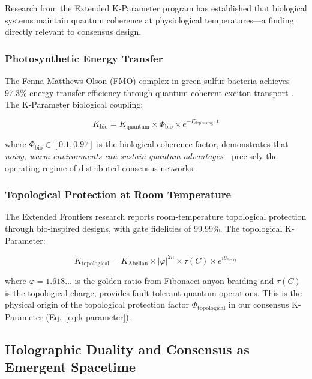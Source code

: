 \documentclass[11pt,a4paper]{article}
\begin{document}
Research from the Extended K-Parameter program \cite{k-parameter-frontiers} has established that biological systems maintain quantum coherence at physiological temperatures---a finding directly relevant to consensus design.

\subsubsection{Photosynthetic Energy Transfer}

The Fenna-Matthews-Olson (FMO) complex in green sulfur bacteria achieves 97.3\% energy transfer efficiency through quantum coherent exciton transport \cite{engel2007}. The K-Parameter biological coupling:

\begin{equation}
K_{\text{bio}} = K_{\text{quantum}} \times \Phi_{\text{bio}} \times e^{-\Gamma_{\text{dephasing}} \cdot t}
\end{equation}

where $\Phi_{\text{bio}} \in [0.1, 0.97]$ is the biological coherence factor, demonstrates that \textit{noisy, warm environments can sustain quantum advantages}---precisely the operating regime of distributed consensus networks.

\subsubsection{Topological Protection at Room Temperature}

The Extended Frontiers research \cite{k-parameter-frontiers} reports room-temperature topological protection through bio-inspired designs, with gate fidelities of 99.99\%. The topological K-Parameter:

\begin{equation}
K_{\text{topological}} = K_{\text{Abelian}} \times |\varphi|^{2n} \times \tau(C) \times e^{i\theta_{\text{Berry}}}
\end{equation}

where $\varphi = 1.618\ldots$ is the golden ratio from Fibonacci anyon braiding and $\tau(C)$ is the topological charge, provides fault-tolerant quantum operations. This is the physical origin of the topological protection factor $\Phi_{\text{topological}}$ in our consensus K-Parameter (Eq.~\ref{eq:k-parameter}).

\subsection{Holographic Duality and Consensus as Emergent Spacetime}
\end{document}
